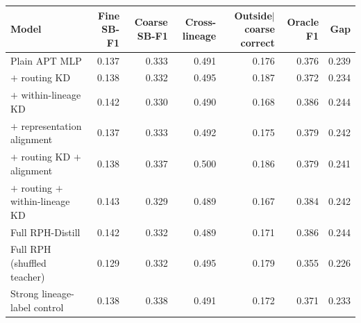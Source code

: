 \begin{tabular}{lrrrrrr}
\toprule
Model & Fine SB-F1 & Coarse SB-F1 & Cross-lineage & Outside$\mid$coarse correct & Oracle F1 & Gap \\
\midrule
Plain APT MLP & 0.137 & 0.333 & 0.491 & 0.176 & 0.376 & 0.239 \\
$+$ routing KD & 0.138 & 0.332 & 0.495 & 0.187 & 0.372 & 0.234 \\
$+$ within-lineage KD & 0.142 & 0.330 & 0.490 & 0.168 & 0.386 & 0.244 \\
$+$ representation alignment & 0.137 & 0.333 & 0.492 & 0.175 & 0.379 & 0.242 \\
$+$ routing KD $+$ alignment & 0.138 & 0.337 & 0.500 & 0.186 & 0.379 & 0.241 \\
$+$ routing $+$ within-lineage KD & 0.143 & 0.329 & 0.489 & 0.167 & 0.384 & 0.242 \\
Full RPH-Distill & 0.142 & 0.332 & 0.489 & 0.171 & 0.386 & 0.244 \\
Full RPH (shuffled teacher) & 0.129 & 0.332 & 0.495 & 0.179 & 0.355 & 0.226 \\
Strong lineage-label control & 0.138 & 0.338 & 0.491 & 0.172 & 0.371 & 0.233 \\
\bottomrule
\end{tabular}
